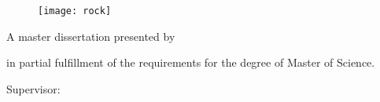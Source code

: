 %
%
% 
%

\thispagestyle{empty}
\addtocounter{page}{-1}

\begin{center}
  \LARGE {\semibold \myProject}

  \vfill

  \begin{figure}[h]
    \centering
    \texttt{[image: rock]}
  \end{figure}

  \vfill
  \large A master dissertation presented by
  \vspace{5mm}

  {\semibold \myName}

  \vspace{5mm}

  in partial fulfillment of the requirements for the degree of Master of
  Science.

  \vfill

  Supervisor: \mySupervisor

  \vfill
  \myDept \\
  \myUni \\
  \myDate
\end{center}
\skiponepage
